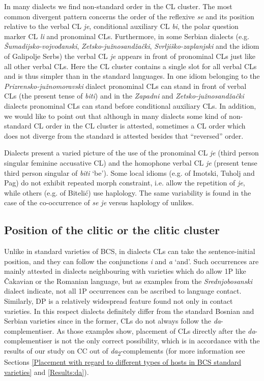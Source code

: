 In many dialects we find non-standard order in the CL cluster. The most common divergent pattern concerns the order of the reflexive \textit{se} and its position relative to the verbal CL \textit{je}, conditional auxiliary CL \textit{bi}, the polar question marker CL \textit{li} and pronominal CLs. Furthermore, in some Serbian dialects (e.g. \textit{Šu\-ma\-dij\-sko-voj\-vo\-đan\-ski}, \textit{Zetsko-južnosandžački}, \textit{Svrljiško-zaplanjski} and the idiom of Ga\-li\-po\-lje Serbs) the verbal CL \textit{je} appears in front of pronominal CLs just like all other verbal CLs. Here the CL cluster contains a single slot for all verbal CLs and is thus simpler than in the standard languages. In one idiom belonging to the \textit{Prizrensko-južnomoravski} dialect pronominal CLs can stand in front of verbal CLs (the present tense of \textit{biti}) and in the \textit{Zapadni} and \textit{Zetsko-južnosandžački} dialects pronominal CLs can stand before conditional auxiliary CLs. In addition, we would like to point out that although in many dialects some kind of non-standard CL order in the CL cluster is attested, sometimes a CL order which does not diverge from the standard is attested besides that “reversed” order. 

Dialects present a varied picture of the use of the pronominal CL \textit{je} (third person singular feminine accusative CL) and the homophone verbal CL \textit{je} (present tense third person singular of \textit{biti} ‘be’). Some local idioms (e.g. of Imotski, Tuholj and Pag) do not exhibit repeated morph constraint, i.e. allow the repetition of \textit{je}, while others (e.g. of Bitelić) use haplology. The same variability is found in the case of the co-occurrence of \textit{se je} versus haplology of unlikes. 

\subsection{Position of the clitic or the clitic cluster}

Unlike in standard varieties of BCS, in dialects CLs can take the sentence-initial position, and they can follow the conjunctions \textit{i} and \textit{a} ‘and’. Such occurrences are mainly attested in dialects neighbouring with varieties which do allow 1P like Čakavian or the Romanian language, but as examples from the \textit{Srednjobosanski} dialect indicate, not all 1P occurrences can be ascribed to language contact. Similarly, DP is a relatively widespread feature found not only in contact varieties. In this respect dialects definitely differ from the standard Bosnian and Serbian varieties since in the former, CLs do not always follow the \textit{da}-complementiser. As those examples show, placement of CLs directly after the \textit{da}-complementiser is not the only correct possibility, which is in accordance with the results of our study on CC out of \textit{da}\textsubscript{2}-complements (for more information see Sections \ref{Placement with regard to different types of hosts in BCS standard varieties} and \ref{Results:da}).

